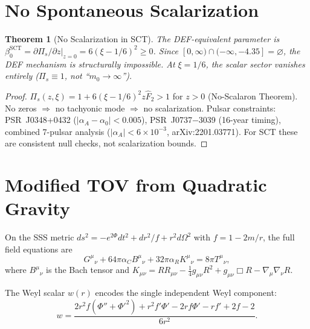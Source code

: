 \documentclass[12pt,a4paper]{article}
\newtheorem{theorem}{Theorem}[section]
\begin{document}
\section{No Spontaneous Scalarization}
\label{sec:scalarization}

\begin{theorem}[No Scalarization in SCT]
\label{thm:no-scalar}
The DEF-equivalent parameter is
$\beta_0^{\mathrm{SCT}} = \partial\Pi_s/\partial z|_{z=0} = 6(\xi-1/6)^2 \geq 0$.
Since $[0,\infty) \cap (-\infty,-4.35] = \varnothing$, the DEF mechanism
is structurally impossible.  At $\xi = 1/6$, the scalar sector vanishes
entirely ($\Pi_s \equiv 1$, not ``$m_0 \to \infty$'').
\end{theorem}

\begin{proof}
$\Pi_s(z,\xi) = 1 + 6(\xi-1/6)^2 z\hat{F}_2 > 1$ for $z > 0$
(No-Scalaron Theorem).  No zeros $\Rightarrow$ no tachyonic mode
$\Rightarrow$ no scalarization.
Pulsar constraints: PSR~J0348+0432 ($|\alpha_A - \alpha_0| < 0.005$),
PSR~J0737$-$3039 (16-year timing), combined 7-pulsar analysis
($|\alpha_A| < 6 \times 10^{-3}$, arXiv:2201.03771).
For SCT these are consistent null checks, not scalarization bounds.
\end{proof}

\section{Modified TOV from Quadratic Gravity}
\label{sec:mod-tov}

On the SSS metric $ds^2 = -e^{2\Phi}dt^2 + dr^2/f + r^2d\Omega^2$
with $f = 1 - 2m/r$, the full field equations are
\begin{equation}
  G^\mu{}_\nu + 64\pi\alpha_C B^\mu{}_\nu + 32\pi\alpha_R K^\mu{}_\nu
  = 8\pi T^\mu{}_\nu,
\end{equation}
where $B^\mu{}_\nu$ is the Bach tensor and
$K_{\mu\nu} = RR_{\mu\nu} - \frac{1}{4}g_{\mu\nu}R^2 + g_{\mu\nu}\Box R
- \nabla_\mu\nabla_\nu R$.

The Weyl scalar $w(r)$ encodes the single independent Weyl component:
\begin{equation}
  w = \frac{2r^2f(\Phi''+\Phi'^2) + r^2f'\Phi' - 2rf\Phi' - rf' + 2f - 2}{6r^2}.
\end{equation}
\end{document}
